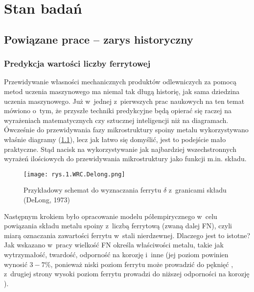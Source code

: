 
\chapter{Stan badań}
\label{cha:stan.badan}

\section{Powiązane prace – zarys historyczny}
\label{sec:zarys.historyczny}

\subsection{Predykcja wartości liczby ferrytowej}
\label{sec:liczba.ferrytowa}

Przewidywanie własności mechanicznych produktów odlewniczych za pomocą metod uczenia maszynowego ma niemal tak długą historię, jak sama dziedzina uczenia maszynowego. Już w~jednej z~pierwszych prac naukowych na ten temat \cite{Olson85} mówiono o~tym, że przyszłe techniki predykcyjne będą opierać się raczej na wyrażeniach matematycznych czy sztucznej inteligencji niż na diagramach. 
Ówcześnie do przewidywania fazy mikrostruktury spoiny metalu wykorzystywano właśnie diagramy (\ref{fig:mesh1}), lecz jak łatwo się domyślić, jest to podejście mało praktyczne. Stąd nacisk na wykorzystywanie jak najbardziej wszechstronnych wyrażeń ilościowych do przewidywania mikrostruktury jako funkcji m.in. składu.

\begin{figure}[h]
    \centering
    \texttt{[image: rys.1.WRC.Delong.png]}
    \caption{Przykładowy schemat do wyznaczania ferrytu $ \delta $ z~granicami składu (DeLong, 1973)}
    \label{fig:mesh1}
\end{figure}

Następnym krokiem było opracowanie modelu półempirycznego w~celu powiązania składu metalu spoiny z~liczbą ferrytową (zwaną dalej FN), czyli miarą oznaczania zawartości ferrytu w~stali nierdzewnej. Dlaczego jest to istotne? Jak wskazano w~pracy \cite{Vitek03.I} wielkość FN określa właściwości metalu, takie jak wytrzymałość, twardość, odporność na korozję i~inne (jej poziom powinien wynosić $3-7\%$, ponieważ niski poziom ferrytu może prowadzić do pęknięć \cite{ferrite.meter, Saluja15}, z~drugiej strony wysoki poziom ferrytu prowadzi do niższej odporności na korozję \cite{Saluja15}). 

